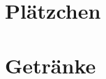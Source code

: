 \documentclass{scrartcl}
\begin{document}
\newpage
{\vspace*{4cm}\section{Plätzchen}}





\newpage
{\vspace*{4cm}\section{Getränke}}


\end{document}
